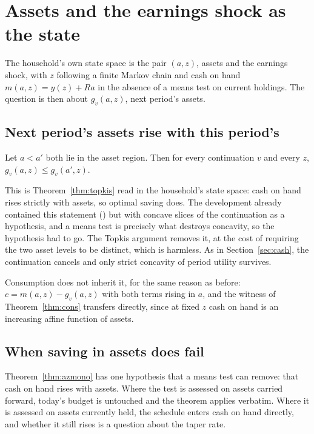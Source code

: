 \section{Assets and the earnings shock as the state}\label{sec:assets}

The household's own state space is the pair $(a,z)$, assets and the earnings shock, with $z$
following a finite Markov chain and cash on hand $m(a,z)=y(z)+Ra$ in the absence of a means test
on current holdings. The question is then about $g_v(a,z)$, next period's assets.

\subsection{Next period's assets rise with this period's}

\begin{theorem}\label{thm:azmono}
Let $a<a'$ both lie in the asset region. Then for every continuation $v$ and every $z$,
$g_v(a,z)\le g_v(a',z)$.
\end{theorem}

This is Theorem~\ref{thm:topkis} read in the household's state space: cash on hand rises strictly
with assets, so optimal saving does. The development already contained this statement
() but with concave slices of the continuation as a hypothesis, and a means
test is precisely what destroys concavity, so the hypothesis had to go. The Topkis argument removes
it, at the cost of requiring the two asset levels to be distinct, which is harmless. As in
Section~\ref{sec:cash}, the continuation cancels and only strict concavity of period utility
survives.

Consumption does not inherit it, for the same reason as before: $c=m(a,z)-g_v(a,z)$ with both
terms rising in $a$, and the witness of Theorem~\ref{thm:cons} transfers directly, since at fixed
$z$ cash on hand is an increasing affine function of assets.

\subsection{When saving in assets does fail}

Theorem~\ref{thm:azmono} has one hypothesis that a means test can remove: that cash on hand rises
with assets. Where the test is assessed on assets carried forward, today's budget is untouched and
the theorem applies verbatim. Where it is assessed on assets currently held, the schedule enters
cash on hand directly, and whether it still rises is a question about the taper rate.

